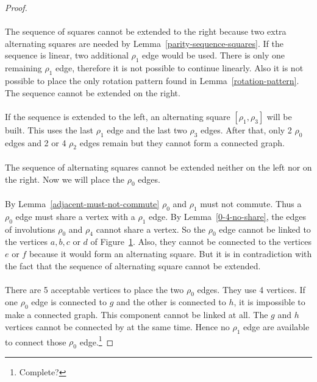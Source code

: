 \begin{proof}
\begin{figure}[H]
\begin{center}
\begin{tikzpicture}[scale=.8]
    \end{tikzpicture}
    \caption{}
    \label{proof-5-3}
  \end{center}
\end{figure}

\paragraph{}
The sequence of squares cannot be extended to the right because two extra alternating squares are needed by Lemma~\ref{parity-sequence-squares}. If the sequence is linear, two additional $\rho_1$ edge would be used. There is only one remaining $\rho_1$ edge, therefore it is not possible to continue linearly. Also it is not possible to place the only rotation pattern found in Lemma~\ref{rotation-pattern}. The sequence cannot be extended on the right.

\paragraph{}
If the sequence is extended to the left, an alternating square $[\rho_1, \rho_3]$ will be built. This uses the last $\rho_1$ edge and the last two $\rho_3$ edges. After that, only 2 $\rho_0$ edges and 2 or 4 $\rho_2$ edges remain but they cannot form a connected graph.

\paragraph{}
The sequence of alternating squares cannot be extended neither on the left nor on the right. Now we will place the $\rho_0$ edges.

\paragraph{}
By Lemma~\ref{adjacent-must-not-commute} $\rho_0$ and $\rho_1$ must not commute. Thus a $\rho_0$ edge must share a vertex with a $\rho_1$ edge. By Lemma~\ref{0-4-no-share}, the edges of involutions $\rho_0$ and $\rho_4$ cannot share a vertex. So the $\rho_0$ edge cannot be linked to the vertices $a, b, c$ or $d$ of Figure~\ref{proof-5-3}. Also, they cannot be connected to the vertices $e$ or $f$ because it would form an alternating square. But it is in contradiction with the fact that the sequence of alternating square cannot be extended.

\paragraph{}
There are 5 acceptable vertices to place the two $\rho_0$ edges. They use 4 vertices. If one $\rho_0$ edge is connected to $g$ and the other is connected to $h$, it is impossible to make a connected graph. This component cannot be linked at all. The $g$ and $h$ vertices cannot be connected by at the same time. Hence no $\rho_1$ edge are available to connect those $\rho_0$ edge.\footnote{Complete?}


\end{proof}
